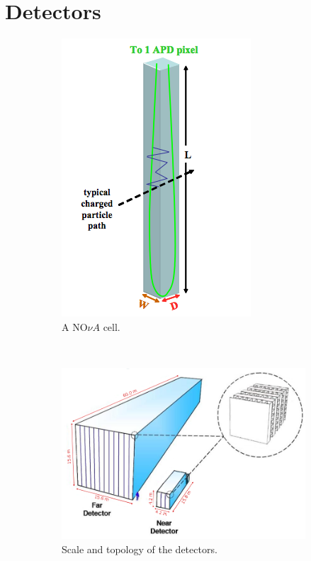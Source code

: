 \section{\nova Detectors}
\label{sec:detectors}

\begin{figure}[t]
\begin{subfigure}[t]{0.25\textwidth}
                \includegraphics[height=0.35\textheight]{figures/figures/cell.png}
               \caption{A NO$\nu A$ cell.}
                 \label{cell}
        \end{subfigure}
        ~
\begin{subfigure}[t]{0.75\textwidth}
                \centering
                \includegraphics[height=0.35\textheight]{figures/figures/detectors.png}
               \caption{Scale and topology of the \nova detectors.}
                \label{detector}

        \end{subfigure}
        \caption{}
\end{figure}

